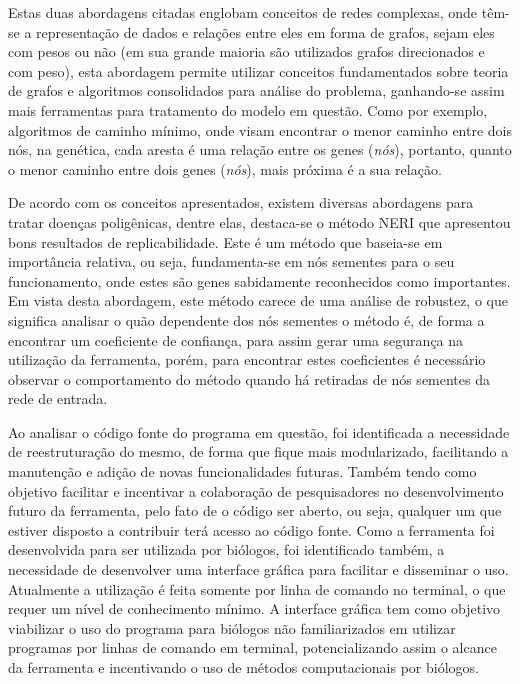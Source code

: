 Estas duas abordagens citadas englobam conceitos de redes complexas, onde têm-se a representação de dados e relações entre eles em forma de grafos, sejam eles com pesos ou não (em sua grande maioria são utilizados grafos direcionados e com peso), esta abordagem permite utilizar conceitos fundamentados sobre teoria de grafos e algoritmos consolidados para análise do problema, ganhando-se assim mais ferramentas para tratamento do modelo em questão.
Como por exemplo, algoritmos de caminho mínimo, onde visam encontrar o menor caminho entre dois nós, na genética, cada aresta é uma relação entre os genes (\textit{nós}), portanto, quanto o menor caminho entre dois genes (\textit{nós}), mais próxima é a sua relação. 

De acordo com os conceitos apresentados, existem diversas abordagens para tratar doenças poligênicas, dentre elas, destaca-se o método NERI que apresentou bons resultados de replicabilidade. Este é um método que baseia-se em importância relativa, ou seja, fundamenta-se em nós sementes para o seu funcionamento, onde estes são genes sabidamente reconhecidos como importantes. Em vista desta abordagem, este método carece de uma análise de robustez, o que significa analisar o quão dependente dos nós sementes o método é, de forma a encontrar um coeficiente de confiança, para assim gerar uma segurança na utilização da ferramenta, porém, para encontrar estes coeficientes é necessário observar o comportamento do método quando há retiradas de nós sementes da rede de entrada.

Ao analisar o código fonte do programa em questão, foi identificada a necessidade de reestruturação do mesmo, de forma que fique mais modularizado, facilitando a manutenção e adição de novas funcionalidades futuras. Também tendo como objetivo facilitar e incentivar a colaboração de pesquisadores no desenvolvimento futuro da ferramenta, pelo fato de o código ser aberto, ou seja, qualquer um que estiver disposto a contribuir terá acesso ao código fonte.
Como a ferramenta foi desenvolvida para ser utilizada por biólogos, foi identificado também, a necessidade de desenvolver uma interface gráfica para facilitar e disseminar o uso. Atualmente a utilização é feita somente por linha de comando no terminal, o que requer um nível de conhecimento mínimo. A interface gráfica tem como objetivo viabilizar o uso do programa para biólogos não familiarizados em utilizar programas por linhas de comando em terminal, potencializando assim o alcance da ferramenta e incentivando o uso de métodos computacionais por biólogos.


